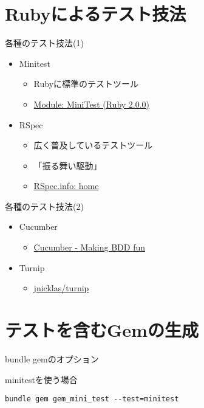 \documentclass[t, aspectratio=169]{beamer}
\begin{document}
\section{Rubyによるテスト技法}
\label{sec-6-1}
\begin{frame}[label=sec-6-1-1]{各種のテスト技法(1)}
\begin{itemize}
\item Minitest
\begin{itemize}
\item Rubyに標準のテストツール
\item \href{http://www.ruby-doc.org/stdlib-2.0/libdoc/minitest/rdoc/MiniTest.html}{Module: MiniTest (Ruby 2.0.0)}
\end{itemize}
\item RSpec
\begin{itemize}
\item 広く普及しているテストツール
\item 「振る舞い駆動」
\item \href{http://rspec.info/}{RSpec.info: home}
\end{itemize}
\end{itemize}
\end{frame}
\begin{frame}[label=sec-6-1-2]{各種のテスト技法(2)}
\begin{itemize}
\item Cucumber
\begin{itemize}
\item \href{http://cukes.info/}{Cucumber - Making BDD fun}
\end{itemize}
\item Turnip
\begin{itemize}
\item \href{https://github.com/jnicklas/turnip}{jnicklas/turnip}
\end{itemize}
\end{itemize}
\end{frame}

\section{テストを含むGemの生成}
\label{sec-6-2}
\begin{frame}[fragile,label=sec-6-2-1]{bundle gemのオプション}
 \begin{block}{minitestを使う場合}
\begin{verbatim}
bundle gem gem_mini_test --test=minitest
\end{verbatim}
\end{block}
\end{frame}
\end{document}
